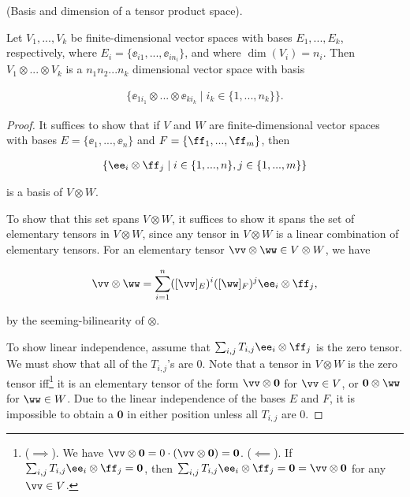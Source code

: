 \newpage

\begin{theorem}
\label{ch::motivated_intro::thm::basis_dim_tensor_product_space}
    (Basis and dimension of a tensor product space). 
    
    Let $V_1, ..., V_k$ be finite-dimensional vector spaces with bases $E_1, ..., E_k$, respectively, where $E_i = \{\ee_{i1}, ..., \ee_{in_i}\}$, and where $\dim(V_i) = n_i$. Then $V_1 \otimes ... \otimes V_k$ is a $n_1 n_2 ... n_k$ dimensional vector space with basis
    
    \begin{align*}
        \{ \ee_{1i_1} \otimes ... \otimes \ee_{ki_k} \mid i_k \in \{1, ..., n_k\} \}.
    \end{align*}
\end{theorem}

\begin{proof}
      It suffices to show that if $V$ and $W$ are finite-dimensional vector spaces with bases $E = \{\ee_1, ..., \ee_n\}$ and $F = \{\ff_1, ..., \ff_m\}$, then
      
      \begin{align*}
          \{\ee_i \otimes \ff_j \mid i \in \{1, ..., n\}, j \in \{1, ..., m\} \}
      \end{align*}
      
      is a basis of $V \otimes W$.
      
      To show that this set spans $V \otimes W$, it suffices to show it spans the set of elementary tensors in $V \otimes W$, since any tensor in $V \otimes W$ is a linear combination of elementary tensors. For an elementary tensor $\vv \otimes \ww \in V \otimes W$, we have
      
      \begin{align*}
          \vv \otimes \ww = \sum_{i = 1}^n ([\vv]_E)^i ([\ww]_F)^j \ee_i \otimes \ff_j,
      \end{align*}
      
      by the seeming-bilinearity of $\otimes$.
      
      To show linear independence, assume that $\sum_{i, j} T_{i, j} \ee_i \otimes \ff_j$ is the zero tensor. We must show that all of the $T_{i,j}$'s are $0$. Note that a tensor in $V \otimes W$ is the zero tensor iff\footnote{($\implies$). We have $\vv \otimes \mathbf{0} = 0 \cdot (\vv \otimes \mathbf{0}) = \mathbf{0}$. ($\impliedby$). If $\sum_{i, j} T_{i, j} \ee_i \otimes \ff_j = \mathbf{0}$, then $\sum_{i, j} T_{i, j} \ee_i \otimes \ff_j = \mathbf{0} = \vv \otimes \mathbf{0}$ for any $\vv \in V$.} it is an elementary tensor of the form $\vv \otimes \mathbf{0}$ for $\vv \in V$, or $\mathbf{0} \otimes \ww$ for $\ww \in W$. Due to the linear independence of the bases $E$ and $F$, it is impossible to obtain a $\mathbf{0}$ in either position unless all $T_{i,j}$ are $0$.
\end{proof}

